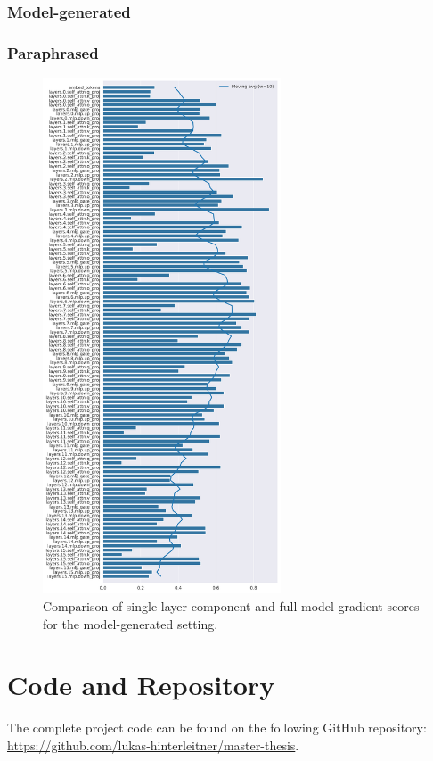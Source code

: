 \subsubsection{Model-generated}

\subsubsection{Paraphrased}
\begin{figure}[ht]
    \centering
    \includegraphics[width=0.63\textwidth]{figures/results/model-generated/layer_comparison_full_gradient.png}
    \caption{Comparison of single layer component and full model gradient scores for the model-generated setting.}
    \label{fig:model_generated_layer_comparison_full_gradient}
\end{figure}

\section{Code and Repository}
The complete project code can be found on the following GitHub repository: \url{https://github.com/lukas-hinterleitner/master-thesis}.
